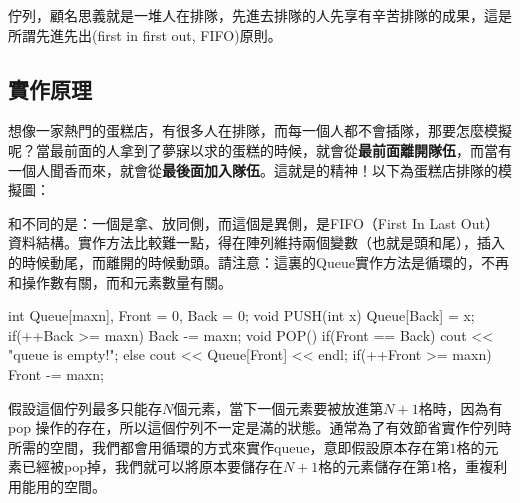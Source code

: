 佇列，顧名思義就是一堆人在排隊，先進去排隊的人先享有辛苦排隊的成果，這是所謂先進先出(first in first out, FIFO)原則。

\subsection{實作原理}
想像一家熱門的蛋糕店，有很多人在排隊，而每一個人都不會插隊，那要怎麼模擬呢？當最前面的人拿到了夢寐以求的蛋糕的時候，就會從\textbf{最前面離開隊伍}，而當有一個人聞香而來，就會從\textbf{最後面加入隊伍}。這就是的精神！以下為蛋糕店排隊的模擬圖：
\begin{center}
\end{center}
和不同的是：一個是拿、放同側，而這個是異側，是FIFO（First In Last Out）資料結構。實作方法比較難一點，得在陣列維持兩個變數（也就是頭和尾），插入的時候動尾，而離開的時候動頭。請注意：這裏的Queue實作方法是循環的，不再和操作數有關，而和元素數量有關。
\begin{C++}
int Queue[maxn], Front = 0, Back = 0;
void PUSH(int x) {
	Queue[Back] = x;
    if(++Back >= maxn) Back -= maxn;
}
void POP(){
    if(Front == Back)
        cout << "queue is empty!\n";
    else{
    	cout << Queue[Front] << endl;
        if(++Front >= maxn) Front -= maxn;
    }
}
\end{C++}
\indent\indent 假設這個佇列最多只能存$N$個元素，當下一個元素要被放進第$N+1$格時，因為有 pop 操作的存在，所以這個佇列不一定是滿的狀態。通常為了有效節省實作佇列時所需的空間，我們都會用循環的方式來實作queue，意即假設原本存在第$1$格的元素已經被pop掉，我們就可以將原本要儲存在$N+1$格的元素儲存在第$1$格，重複利用能用的空間。

